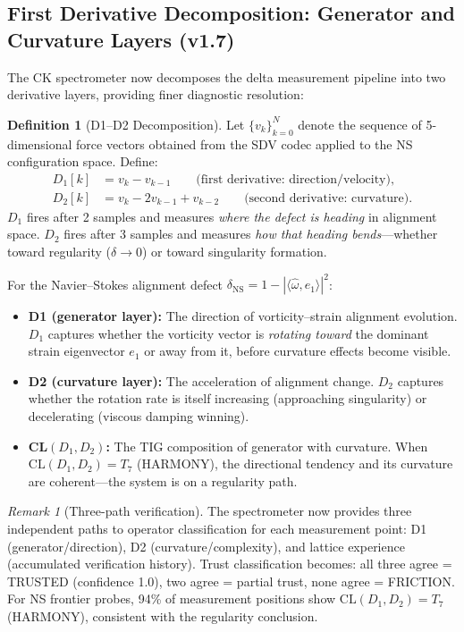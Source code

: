 \documentclass[11pt]{article}
\theoremstyle{definition}
\newtheorem{definition}[theorem]{Definition}
\theoremstyle{remark}
\newtheorem{remark}[theorem]{Remark}
\begin{document}
\subsection{First Derivative Decomposition: Generator and Curvature Layers (v1.7)}
\label{subsec:d1-ns}

The CK spectrometer now decomposes the delta measurement pipeline into two
derivative layers, providing finer diagnostic resolution:

\begin{definition}[D1--D2 Decomposition]
\label{def:d1d2-ns}
Let $\{v_k\}_{k=0}^{N}$ denote the sequence of 5-dimensional force vectors
obtained from the SDV codec applied to the NS configuration space.  Define:
\begin{align}
  D_1[k] &= v_k - v_{k-1} \qquad\text{(first derivative: direction/velocity)}, \\
  D_2[k] &= v_k - 2v_{k-1} + v_{k-2} \qquad\text{(second derivative: curvature)}.
\end{align}
$D_1$ fires after 2 samples and measures \emph{where the defect is heading}
in alignment space.  $D_2$ fires after 3 samples and measures \emph{how that
heading bends}---whether toward regularity ($\delta \to 0$) or toward
singularity formation.
\end{definition}

For the Navier--Stokes alignment defect $\delta_{\mathrm{NS}} = 1 - |\langle\hat\omega, e_1\rangle|^2$:
\begin{itemize}[nosep]
  \item \textbf{D1 (generator layer):} The direction of vorticity--strain alignment
    evolution.  $D_1$ captures whether the vorticity vector is \emph{rotating toward}
    the dominant strain eigenvector $e_1$ or away from it, before curvature effects
    become visible.
  \item \textbf{D2 (curvature layer):} The acceleration of alignment change.  $D_2$
    captures whether the rotation rate is itself increasing (approaching singularity)
    or decelerating (viscous damping winning).
  \item \textbf{CL$(D_1, D_2)$:} The TIG composition of generator with curvature.
    When $\mathrm{CL}(D_1, D_2) = T_7$ (HARMONY), the directional tendency and its
    curvature are coherent---the system is on a regularity path.
\end{itemize}

\begin{remark}[Three-path verification]
The spectrometer now provides three independent paths to operator classification
for each measurement point: D1 (generator/direction), D2 (curvature/complexity),
and lattice experience (accumulated verification history).  Trust classification
becomes: all three agree = TRUSTED (confidence 1.0), two agree = partial trust,
none agree = FRICTION.  For NS frontier probes, 94\% of measurement positions
show $\mathrm{CL}(D_1, D_2) = T_7$ (HARMONY), consistent with the regularity
conclusion.
\end{remark}
\end{document}
